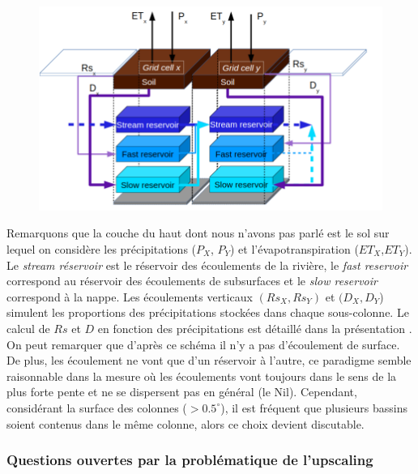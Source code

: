 \documentclass[a4paper,11pt]{article}
\numberwithin{equation}{section}
\begin{document}
\begin{figure}[H]
	\begin{center}
		\includegraphics[scale=0.3]{Orchidee_interaction.png}
	\end{center}
	\label{fig-Orchidee-interact}
\end{figure}

Remarquons que la couche du haut dont nous n'avons pas parlé est le sol sur lequel on considère les précipitations ($P_X$, $P_Y$) et l'évapotranspiration ($ET_X$,$ET_Y$). Le \textit{stream réservoir} est le réservoir des écoulements de la rivière, le \textit{fast reservoir} correspond au réservoir des écoulements de subsurfaces et le \textit{slow reservoir} correspond à la nappe. Les écoulements verticaux $(Rs_X,Rs_Y)$ et $(D_X,D_Y$) simulent les proportions des précipitations stockées dans chaque sous-colonne. Le calcul de $Rs$ et $D$ en fonction des précipitations est détaillé dans la présentation \cite{gumiberteau2017}. On peut remarquer que d'après ce schéma il n'y a pas d'écoulement de surface.
De plus, les écoulement ne vont que d'un réservoir à l'autre, ce paradigme semble raisonnable dans la mesure où les écoulements vont toujours dans le sens de la plus forte pente et ne se dispersent pas en général (le Nil). Cependant, considérant la surface des colonnes ($>0.5^{\circ}$), il est fréquent que plusieurs bassins soient contenus dans le même colonne, alors ce choix devient discutable.

\subsubsection{Questions ouvertes par la problématique de l'upscaling}
\end{document}

